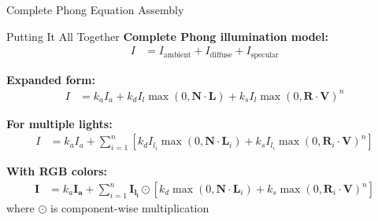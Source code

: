 \begin{frame}{Complete Phong Equation Assembly}
  \begin{mathbox}{Putting It All Together}
    \textbf{Complete Phong illumination model:}
    \begin{align}
      I &= I_{\text{ambient}} + I_{\text{diffuse}} + I_{\text{specular}}
    \end{align}

    \pause
    \textbf{Expanded form:}
    \begin{align}
      I &= k_a I_a + k_d I_l \max(0, \mathbf{N} \cdot \mathbf{L}) + k_s I_l \max(0, \mathbf{R} \cdot \mathbf{V})^n
    \end{align}

    \pause
    \textbf{For multiple lights:}
    \begin{align}
      I &= k_a I_a + \sum_{i=1}^{n} \left[ k_d I_{l_i} \max(0, \mathbf{N} \cdot \mathbf{L}_i) + k_s I_{l_i} \max(0, \mathbf{R}_i \cdot \mathbf{V})^n \right]
    \end{align}

    \pause
    \textbf{With RGB colors:}
    \begin{align}
      \mathbf{I} &= k_a \mathbf{I_a} + \sum_{i=1}^{n} \mathbf{I_{l_i}} \odot \left[ k_d \max(0, \mathbf{N} \cdot \mathbf{L}_i) + k_s \max(0, \mathbf{R}_i \cdot \mathbf{V})^n \right]
    \end{align}
    where $\odot$ is component-wise multiplication
  \end{mathbox}
\end{frame}


